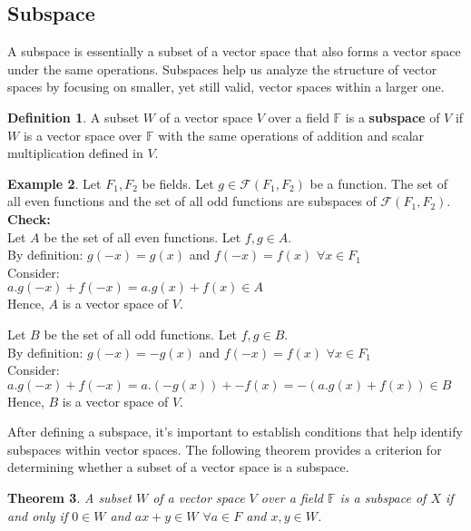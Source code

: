 \documentclass[12pt, reqno]{amsart}
\newtheorem{theorem}{Theorem}[section]
\theoremstyle{definition}
\newtheorem{definition}[theorem]{Definition}
\newtheorem{example}[theorem]{Example}
\numberwithin{equation}{section}
\newcommand{\dF}{{\mathbb F}}
\newcommand{\tabb}{\hspace*{1cm}}
\begin{document}
\subsection{Subspace}
A subspace is essentially a subset of a vector space that also forms a vector space under the same operations. Subspaces help us analyze the structure of vector spaces by focusing on smaller, yet still valid, vector spaces within a larger one.

\begin{definition}
    A subset $W$ of a vector space $V$ over a field $\dF$ is a \textbf{subspace} of $V$ if $W$ is a vector space over $\dF$ with the same operations of addition and scalar multiplication defined in $V$.
\end{definition}

\begin{example}
    Let $F_1, F_2$ be fields. Let $g \in \mathscr{F} (F_1, F_2)$ be a function. The set of all even functions and the set of all odd functions are subspaces of $\mathscr{F} (F_1, F_2)$.\\
    \textbf{Check:}\\
    Let $A$ be the set of all even functions. Let $f, g \in A$.\\
    By definition: $g(-x) = g(x)$ and $f(-x) = f(x)$ $\forall x \in F_1$\\
    Consider:\\
    \tabb $a.g(-x) + f(-x) = a.g(x)+f(x) \in A$\\
    Hence, $A$ is a vector space of $V$.

    Let $B$ be the set of all odd functions. Let $f, g \in B$.\\
    By definition: $g(-x) = -g(x)$ and $f(-x) = f(x)$ $\forall x \in F_1$\\
    Consider:\\
    \tabb $a.g(-x) + f(-x) = a.(-g(x))+-f(x) = -(a.g(x)+f(x)) \in B$\\
    Hence, $B$ is a vector space of $V$.    
\end{example}

After defining a subspace, it's important to establish conditions that help identify subspaces within vector spaces. The following theorem provides a criterion for determining whether a subset of a vector space is a subspace.

\begin{theorem}
    A subset $W$ of a vector space $V$ over a field $\dF$ is a subspace of $X$ if and only if $0 \in W$ and $ax+y \in W$ $\forall a \in F$ and $x,y \in W$.
\end{theorem}
\end{document}
